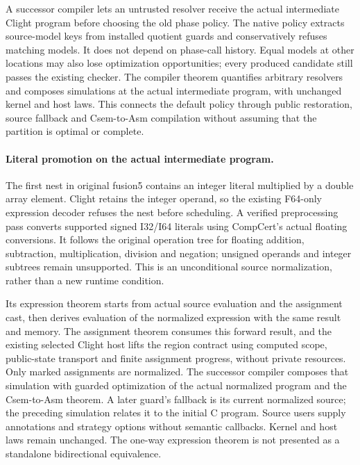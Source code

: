 A successor compiler lets an untrusted resolver receive the actual intermediate
Clight program before choosing the old phase policy. The native policy extracts
source-model keys from installed quotient guards and conservatively refuses
matching models. It does not depend on phase-call history. Equal models at
other locations may also lose optimization opportunities; every produced
candidate still passes the existing checker. The compiler theorem quantifies
arbitrary resolvers and composes simulations at the actual intermediate
program, with unchanged kernel and host laws. This connects the default policy
through public restoration, source fallback and Csem-to-Asm compilation without
assuming that the partition is optimal or complete.

\paragraph{Literal promotion on the actual intermediate program.}
The first nest in original fusion5 contains an integer literal multiplied by a
double array element. Clight retains the integer operand, so the existing
F64-only expression decoder refuses the nest before scheduling. A verified
preprocessing pass converts supported signed I32/I64 literals using CompCert's
actual floating conversions. It follows the original operation tree for
floating addition, subtraction, multiplication, division and negation;
unsigned operands and integer subtrees remain unsupported. This is an
unconditional source normalization, rather than a new runtime condition.

Its expression theorem starts from actual source evaluation and the assignment
cast, then derives evaluation of the normalized expression with the same
result and memory. The assignment theorem consumes this forward result, and
the existing selected Clight host lifts the region contract using computed
scope, public-state transport and finite assignment progress, without private
resources. Only marked assignments are normalized. The successor compiler
composes that simulation with guarded optimization of the actual normalized
program and the Csem-to-Asm theorem. A later guard's fallback is its current
normalized source; the preceding simulation relates it to the initial C
program. Source users supply annotations and strategy options without semantic
callbacks. Kernel and host laws remain unchanged. The one-way expression
theorem is not presented as a standalone bidirectional equivalence.

